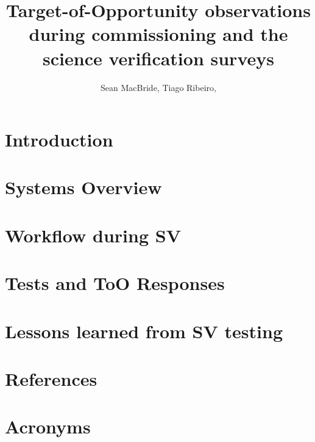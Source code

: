 \documentclass[OPS,lsstdraft,authoryear,toc]{lsstdoc}
\title{Target-of-Opportunity observations during commissioning and the science verification surveys}
\author{%
Sean MacBride,
Tiago Ribeiro,
}
\date{\vcsDate}
\begin{document}
\maketitle
\section{Introduction}\label{sec:introduction}

\newpage
\section{Systems Overview}\label{sec:sysOverview}

% 
\newpage
\section{Workflow during SV}\label{sec:workflow}

\newpage
\section{Tests and ToO Responses}\label{sec:ToOEvents}

\newpage
\section{Lessons learned from SV testing}\label{sec:LessonsLearned}


\appendix
\newpage
\section{References} \label{sec:bib}
\renewcommand{\refname}{} %


\newpage
\section{Acronyms} \label{sec:acronyms}

\end{document}
